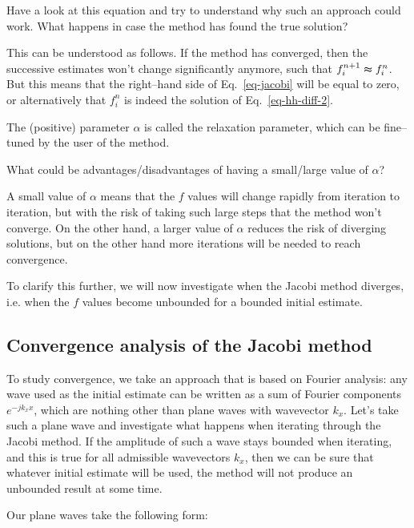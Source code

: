 \begin{cue}
Have a look at this equation and try to understand why such an approach could work. What happens in case the method has found the true solution?  
\end{cue}

This can be understood as follows. If the method has converged, then the successive estimates won't change significantly anymore, such that $ f_i^{n+1} \thickapprox f_i^n $. But this means that the right--hand side of Eq.~\ref{eq-jacobi} will be equal to zero, or alternatively that $f_i^n$ is indeed the solution of Eq.~\ref{eq-hh-diff-2}.

The (positive) parameter $\alpha$ is called the relaxation parameter, which can be fine--tuned by the user of the method.

\begin{cue}
What could be advantages/disadvantages of having a small/large value of $\alpha$? 
\end{cue}

A small value of $\alpha$ means that the $f$ values will change rapidly from iteration to iteration, but with the risk of taking such large steps that the method won't converge. On the other hand, a larger value of $\alpha$ reduces the risk of diverging solutions, but on the other hand more iterations will be needed to reach convergence.

To clarify this further, we will now investigate when the Jacobi method diverges, i.e. when the $f$ values become unbounded for a bounded initial estimate.

\subsection{Convergence analysis of the Jacobi method}

To study convergence, we take an approach that is based on Fourier analysis: any wave used as the initial estimate can be written as a sum of Fourier components $e^{-j k_x x}$, which are nothing other than plane waves with wavevector $k_x$. Let's take such a plane wave and investigate what happens when iterating through the Jacobi method. If the amplitude of such a wave stays bounded when iterating, and this is true for all admissible wavevectors $k_x$, then we can be sure that whatever initial estimate will be used, the method will not produce an unbounded result at some time.

Our plane waves take the following form:

